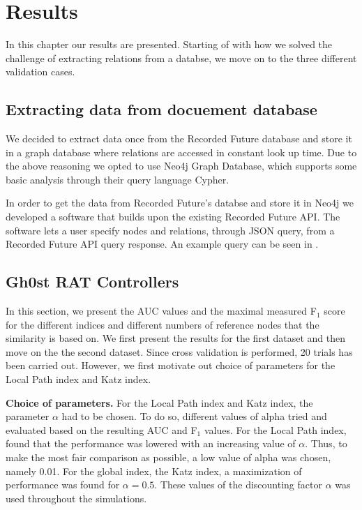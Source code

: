 \chapter{Results}
In this chapter our results are presented. Starting of with how we solved the challenge of extracting relations from a databse, we move on to the three different validation cases.

\section{Extracting data from docuement database}
We decided to extract data once from the Recorded Future database and store it in a graph database where relations are accessed in constant look up time. Due to the above reasoning we opted to use Neo4j Graph Database, which supports some basic analysis through their query language Cypher.

In order to get the data from Recorded Future's databse and store it in Neo4j we developed a software that builds upon the existing Recorded Future API. The software lets a user specify nodes and relations, through JSON query, from a Recorded Future API query response. An example query can be seen in .

\section{Gh0st RAT Controllers}
In this section, we present the AUC values and the maximal measured F$_1$ score for the different indices and different numbers of reference nodes that the similarity is based on. We first present the results for the first dataset and then move on the the second dataset. Since cross validation is performed, 20 trials has been carried out. However, we first motivate out choice of parameters for the Local Path index and Katz index.

\textbf{Choice of parameters.} For the Local Path index and Katz index,  the parameter $\alpha$ had to be chosen. To do so, different values of alpha  tried and evaluated based on the resulting AUC and F$_1$ values. For the Local Path index, found that the performance was lowered with an increasing value of $\alpha$. Thus, to make the most fair comparison as possible, a low value of alpha was chosen, namely 0.01. For the global index, the Katz index, a maximization of performance was found for $\alpha=0.5$. These values of the discounting factor $\alpha$ was used throughout the simulations. 

